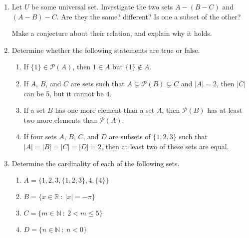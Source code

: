\documentclass[12pt]{article}
\newcommand{\RR}{{\mathbb R}}  %
\newcommand{\NN}{{\mathbb N}}  %
\newcommand{\calP}{{\mathcal P}}  %
\newcommand{\sep}{{\ :\ }}     %
\begin{document}
\begin{enumerate}
\item  Let  $U$ be some universal set.
  Investigate the two sets $A-(B-C)$ and $(A-B)-C$. \newline
  Are they the same? different? Is one a subset of the other?

  Make a conjecture about their relation, and explain why it holds.

\item Determine whether the following statements are true or false.

  \begin{enumerate}
  \item  If $\{1\}\in\calP(A)$, then $1\in A$ but $\{1\}\not\in A$.

  \item If $A$, $B$, and $C$ are sets such that $A\subsetneq\calP(B)\subsetneq C$ and $|A|=2$, then $|C|$ can be 5, but it cannot be $4$.

  \item If a set $B$ has one more element than a set $A$, then $\calP(B)$ has at least two more elements than $\calP(A)$.

  \item If four sets $A$, $B$, $C$, and $D$ are subsets of $\{1,2,3\}$ such that $|A|=|B|=|C|=|D|=2$, then at least two of these sets are
    equal. 

  \end{enumerate}

\item Determine the cardinality of each of the following sets.

  \begin{enumerate}
  \item  $A=\{1,2,3,\{1,2,3\},4,\{4\}\}$

  \item  $B=\{x\in\RR \sep  |x|=-\pi\}$

  \item $C=\{m\in\NN \sep  2<m\leq 5\}$

  \item $D=\{n\in\NN \sep  n<0\}$


\end{enumerate}
\end{enumerate}
\end{document}
